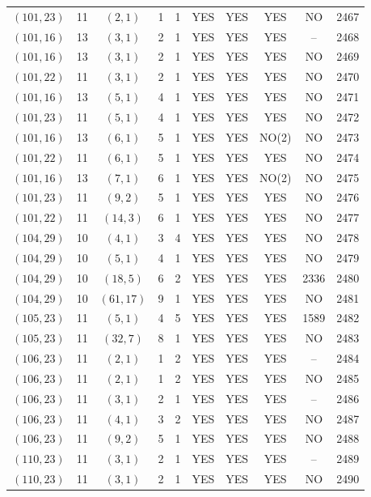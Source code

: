 \begin{longtable}{|c|c|c|c|c|c|c|c|c|c|}
$(101, 23)$ & 11 & $(2, 1)$ & 1 & 1 & YES & YES & YES & NO & 2467\\
$(101, 16)$ & 13 & $(3, 1)$ & 2 & 1 & YES & YES & YES & -- & 2468\\
$(101, 16)$ & 13 & $(3, 1)$ & 2 & 1 & YES & YES & YES & NO & 2469\\
$(101, 22)$ & 11 & $(3, 1)$ & 2 & 1 & YES & YES & YES & NO & 2470\\
$(101, 16)$ & 13 & $(5, 1)$ & 4 & 1 & YES & YES & YES & NO & 2471\\
$(101, 23)$ & 11 & $(5, 1)$ & 4 & 1 & YES & YES & YES & NO & 2472\\
$(101, 16)$ & 13 & $(6, 1)$ & 5 & 1 & YES & YES & NO(2) & NO & 2473\\
$(101, 22)$ & 11 & $(6, 1)$ & 5 & 1 & YES & YES & YES & NO & 2474\\
$(101, 16)$ & 13 & $(7, 1)$ & 6 & 1 & YES & YES & NO(2) & NO & 2475\\
$(101, 23)$ & 11 & $(9, 2)$ & 5 & 1 & YES & YES & YES & NO & 2476\\
$(101, 22)$ & 11 & $(14, 3)$ & 6 & 1 & YES & YES & YES & NO & 2477\\
$(104, 29)$ & 10 & $(4, 1)$ & 3 & 4 & YES & YES & YES & NO & 2478\\
$(104, 29)$ & 10 & $(5, 1)$ & 4 & 1 & YES & YES & YES & NO & 2479\\
$(104, 29)$ & 10 & $(18, 5)$ & 6 & 2 & YES & YES & YES & 2336 & 2480\\
$(104, 29)$ & 10 & $(61, 17)$ & 9 & 1 & YES & YES & YES & NO & 2481\\
$(105, 23)$ & 11 & $(5, 1)$ & 4 & 5 & YES & YES & YES & 1589 & 2482\\
$(105, 23)$ & 11 & $(32, 7)$ & 8 & 1 & YES & YES & YES & NO & 2483\\
$(106, 23)$ & 11 & $(2, 1)$ & 1 & 2 & YES & YES & YES & -- & 2484\\
$(106, 23)$ & 11 & $(2, 1)$ & 1 & 2 & YES & YES & YES & NO & 2485\\
$(106, 23)$ & 11 & $(3, 1)$ & 2 & 1 & YES & YES & YES & -- & 2486\\
$(106, 23)$ & 11 & $(4, 1)$ & 3 & 2 & YES & YES & YES & NO & 2487\\
$(106, 23)$ & 11 & $(9, 2)$ & 5 & 1 & YES & YES & YES & NO & 2488\\
$(110, 23)$ & 11 & $(3, 1)$ & 2 & 1 & YES & YES & YES & -- & 2489\\
$(110, 23)$ & 11 & $(3, 1)$ & 2 & 1 & YES & YES & YES & NO & 2490\\

\end{longtable}
